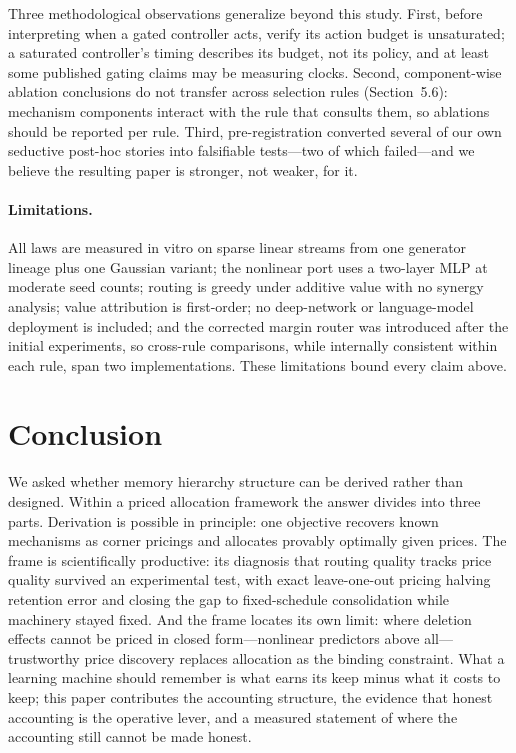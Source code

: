 \documentclass[11pt]{article}
\begin{document}
Three methodological observations generalize beyond this study. First, before interpreting when a gated
controller acts, verify its action budget is unsaturated; a saturated controller's timing describes its
budget, not its policy, and at least some published gating claims may be measuring clocks. Second,
component-wise ablation conclusions do not transfer across selection rules (Section~5.6): mechanism
components interact with the rule that consults them, so ablations should be reported per rule. Third,
pre-registration converted several of our own seductive post-hoc stories into falsifiable tests---two
of which failed---and we believe the resulting paper is stronger, not weaker, for it.

\paragraph{Limitations.} All laws are measured in vitro on sparse linear streams from one generator
lineage plus one Gaussian variant; the nonlinear port uses a two-layer MLP at moderate seed counts;
routing is greedy under additive value with no synergy analysis; value attribution is first-order; no
deep-network or language-model deployment is included; and the corrected margin router was introduced
after the initial experiments, so cross-rule comparisons, while internally consistent within each rule,
span two implementations. These limitations bound every claim above.

\section{Conclusion}

We asked whether memory hierarchy structure can be derived rather than designed. Within a priced
allocation framework the answer divides into three parts. Derivation is possible in principle: one
objective recovers known mechanisms as corner pricings and allocates provably optimally given prices.
The frame is scientifically productive: its diagnosis that routing quality tracks price quality
survived an experimental test, with exact leave-one-out pricing halving retention error and closing the
gap to fixed-schedule consolidation while machinery stayed fixed. And the frame locates its own limit:
where deletion effects cannot be priced in closed form---nonlinear predictors above all---trustworthy
price discovery replaces allocation as the binding constraint. What a learning machine should remember
is what earns its keep minus what it costs to keep; this paper contributes the accounting structure,
the evidence that honest accounting is the operative lever, and a measured statement of where the
accounting still cannot be made honest.
\end{document}
